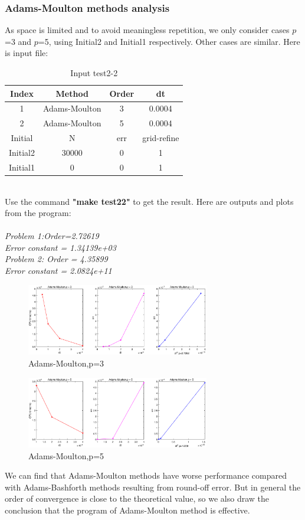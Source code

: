 \documentclass[a4paper,twocolumn]{article}
\theoremstyle{definition}
\begin{document}
\subsubsection{Adams-Moulton methods analysis}
As space is limited and to avoid meaningless repetition, we only consider cases $p$=3 and $p$=5, using Initial2 and Initial1  respectively. Other cases are similar. Here is input file:
\begin{table}[!htp]
	\centering
	\begin{tabular}{|c|c|c|c|}
		\hline	
		Index & Method & Order & dt \\
		\hline		
		1 & Adams-Moulton & 3 & 0.0004   \\	
		\hline		
		2 & Adams-Moulton & 5 & 0.0004   \\	
		\hline \hline
		Initial & N & err & grid-refine \\
		\hline
		Initial2 & 30000 & 0 & 1 \\
		\hline
		Initial1 & 0 & 0 & 1 \\
		\hline
	\end{tabular}
	\caption{Input test2-2}
	\label{tab:test22}
\end{table}\\
Use the command \textbf{"make test22"} to get the result. Here are outputs and plots from the program:\\\\
\emph{Problem 1:Order=2.72619}\\
\emph{Error constant = 1.34139e+03}\\
\emph{Problem 2: Order = 4.35899}\\
\emph{Error constant = 2.0824e+11}

\begin{figure}[!htp]   
	\centering
	\includegraphics[width=8cm]{Pictures/2_2_1.eps}
	\caption{Adams-Moulton,p=3}
	\label{fig:AM3gf}
\end{figure}
\begin{figure}[!htp]   
	\centering
	\includegraphics[width=8cm]{Pictures/2_2_2.eps}
	\caption{Adams-Moulton,p=5}
	\label{fig:AM5gf}
\end{figure}
\noindent We can find that Adams-Moulton methods have worse performance compared with Adams-Bashforth methods resulting from round-off error. But in general the order of convergence is close to the theoretical value, so we also draw the conclusion that the program of Adams-Moulton method is effective. 
\end{document}
